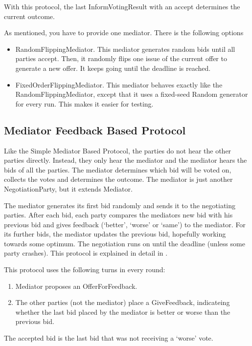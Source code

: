 \documentclass[]{article}
\newcommand*\vtick{\textsc{\char13}}
\begin{document}
With this protocol, the last InformVotingResult with an accept determines the current outcome. 

As mentioned, you have to provide one mediator. There is the following options 
\begin{itemize}
\item RandomFlippingMediator.   This mediator generates random bids until all parties accept. Then, it
  randomly flips one issue of the current offer to generate a new offer. It
  keeps going until the deadline is reached. 
 \item FixedOrderFlippingMediator.   This mediator behaves exactly like the RandomFlippingMediator, except that it uses a fixed-seed Random generator for every run. This makes it easier for testing. 

\end{itemize}

\subsection{Mediator  Feedback Based Protocol}
Like the Simple Mediator Based Protocol, the parties do not hear the other parties directly. Instead, they only hear the mediator and the mediator hears the bids of all the parties. The mediator determines which bid will be voted on, collects the votes and determines the outcome. The mediator is just another NegotiationParty, but it extends Mediator.

 The mediator generates its first bid randomly and sends it to the negotiating parties. After each bid, each party compares the mediator\vtick s new bid with his previous bid and gives feedback (`better', `worse' or `same')  to the mediator. For its further bids, the mediator updates the previous bid, hopefully working towards some optimum. The negotiation runs on until the deadline (unless some party crashes). This protocol is explained in detail in \cite{MultiMediatedNegoProtocolsWithFeedback}.

This protocol uses the following turns in every round:
\begin{enumerate}
\item Mediator proposes an OfferForFeedback. 
\item The other parties (not the mediator) place a GiveFeedback,  indicateing whether the last bid placed by the mediator is better or worse than the previous bid.
\end{enumerate}

The accepted bid is the last bid that was not receiving a `worse' vote. 
\end{document}
